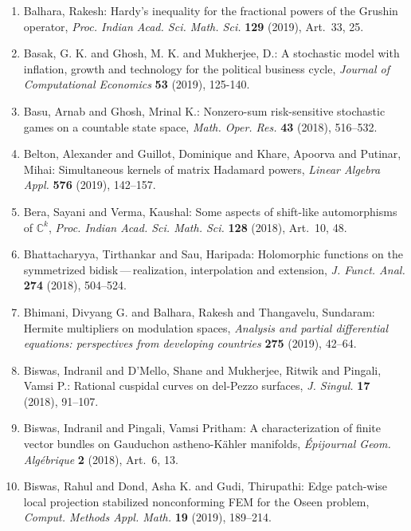 \begin{enumerate}[leftmargin=27pt]
	\item Balhara, Rakesh: Hardy's inequality for the fractional powers of the {G}rushin
	      operator, {\em Proc. Indian Acad. Sci. Math. Sci.} {\bf 129} (2019), Art.~33, 25.

	\item\label{ghosh:political-business-cycle} Basak, G. K. and Ghosh, M. K. and Mukherjee, D.: A stochastic model with inflation,
	      growth and technology for the political business cycle, {\em Journal of Computational Economics} {\bf 53} (2019), 125-140.

	\item Basu, Arnab and Ghosh, Mrinal K.: Nonzero-sum risk-sensitive stochastic games on a countable
	      state space, {\em Math. Oper. Res.} {\bf 43} (2018), 516--532.

	\item Belton, Alexander and Guillot, Dominique and Khare, Apoorva
	      and Putinar, Mihai: Simultaneous kernels of matrix {H}adamard powers, {\em Linear Algebra Appl.} {\bf 576} (2019), 142--157.

	\item Bera, Sayani and Verma, Kaushal: Some aspects of shift-like automorphisms of {$\mathbb C^k$},
	      {\em Proc. Indian Acad. Sci. Math. Sci.} {\bf 128} (2018), Art.~10, 48.

	\item Bhattacharyya, Tirthankar and Sau, Haripada: Holomorphic functions on the symmetrized
	      bidisk\,---\,realization, interpolation and extension, {\em J. Funct. Anal.} {\bf 274} (2018), 504--524.

	\item Bhimani, Divyang G. and Balhara, Rakesh and Thangavelu,
	      Sundaram: Hermite multipliers on modulation spaces, {\em Analysis and partial differential equations:
			      perspectives from developing countries} {\bf 275} (2019), 42--64.

	\item Biswas, Indranil and D'Mello, Shane and Mukherjee, Ritwik and Pingali, Vamsi P.: Rational cuspidal
	      curves on del-{P}ezzo surfaces, {\em J. Singul.} {\bf 17} (2018), 91--107.

	\item Biswas, Indranil and Pingali, Vamsi Pritham: A characterization of finite vector bundles on
		      {G}auduchon astheno-{K}\"{a}hler manifolds, {\em \'{E}pijournal Geom. Alg\'{e}brique} {\bf 2} (2018), Art.~6, 13.

	\item Biswas, Rahul and Dond, Asha K. and Gudi, Thirupathi: Edge patch-wise local projection stabilized nonconforming
		      {FEM} for the {O}seen problem, {\em Comput. Methods Appl. Math.} {\bf 19} (2019), 189--214.


\end{enumerate}
